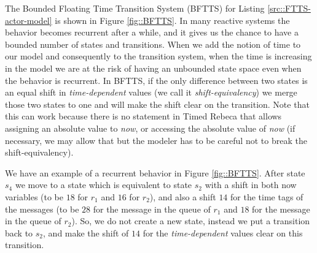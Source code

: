 The Bounded Floating Time Transition System (BFTTS) for Listing \ref{src::FTTS-actor-model} is shown in Figure \ref{fig::BFTTS}. 
In many reactive systems the behavior becomes recurrent after a while, and it gives us the chance to have a bounded number of states and transitions. When we add the notion of time to our model and consequently to the transition system, when the time is increasing in the model we are at the risk of having an unbounded %
state space even when the behavior is recurrent.
In BFTTS, if the only difference between two states is an equal shift in \textit{time-dependent} values (we call it \textit{shift-equivalency}) we merge those two states to one and will make the shift clear on the transition. %
Note that this can work because there is no statement in Timed Rebeca that allows assigning an absolute value to \textit{now}, or accessing the absolute value of \textit{now} (if necessary, we may allow that but the modeler has to be careful not to break the shift-equivalency). 

We have an example of a recurrent behavior in Figure \ref{fig::BFTTS}. After state $s_4$ we move to a state which is equivalent to state $s_2$ with a shift in both now variables (to be $18$ for $r_1$  and $16$ for $r_2$), and also a shift $14$ for the time tags of the messages (to be $28$ for the message in the queue of $r_1$ and $18$ for the message in the queue of $r_2$). So, we do not create a new state, instead we put a transition back to $s_2$, and make the shift of $14$ for the \textit{time-dependent} values clear on this transition. 


